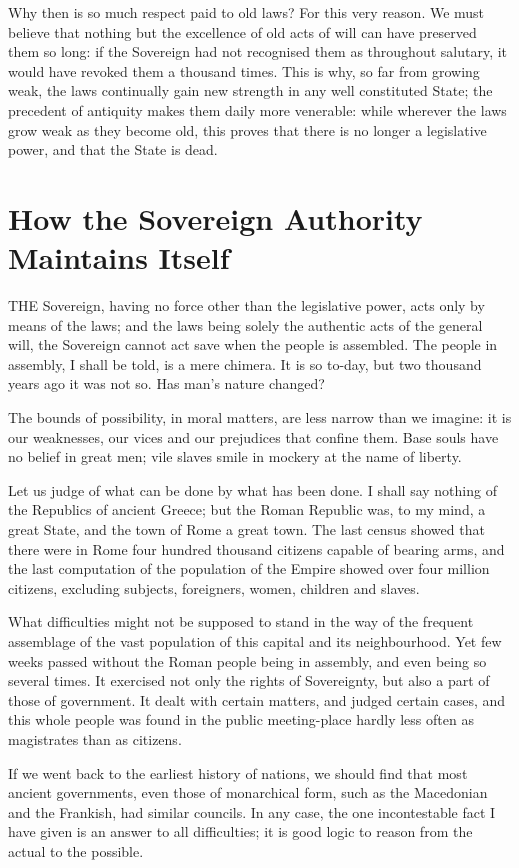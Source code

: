 \documentclass[12pt]{book}
\begin{document}
Why then is so much respect paid to old laws? For this very reason. We must believe that nothing but the excellence of old acts of will can have preserved them so long: if the Sovereign had not recognised them as throughout salutary, it would have revoked them a thousand times. This is why, so far from growing weak, the laws continually gain new strength in any well constituted State; the precedent of antiquity makes them daily more venerable: while wherever the laws grow weak as they become old, this proves that there is no longer a legislative power, and that the State is dead.

\section{How the Sovereign Authority Maintains Itself}
THE Sovereign, having no force other than the legislative power, acts only by means of the laws; and the laws being solely the authentic acts of the general will, the Sovereign cannot act save when the people is assembled. The people in assembly, I shall be told, is a mere chimera. It is so to-day, but two thousand years ago it was not so. Has man's nature changed?

The bounds of possibility, in moral matters, are less narrow than we imagine: it is our weaknesses, our vices and our prejudices that confine them. Base souls have no belief in great men; vile slaves smile in mockery at the name of liberty.

Let us judge of what can be done by what has been done. I shall say nothing of the Republics of ancient Greece; but the Roman Republic was, to my mind, a great State, and the town of Rome a great town. The last census showed that there were in Rome four hundred thousand citizens capable of bearing arms, and the last computation of the population of the Empire showed over four million citizens, excluding subjects, foreigners, women, children and slaves.

What difficulties might not be supposed to stand in the way of the frequent assemblage of the vast population of this capital and its neighbourhood. Yet few weeks passed without the Roman people being in assembly, and even being so several times. It exercised not only the rights of Sovereignty, but also a part of those of government. It dealt with certain matters, and judged certain cases, and this whole people was found in the public meeting-place hardly less often as magistrates than as citizens.

If we went back to the earliest history of nations, we should find that most ancient governments, even those of monarchical form, such as the Macedonian and the Frankish, had similar councils. In any case, the one incontestable fact I have given is an answer to all difficulties; it is good logic to reason from the actual to the possible.
\end{document}
